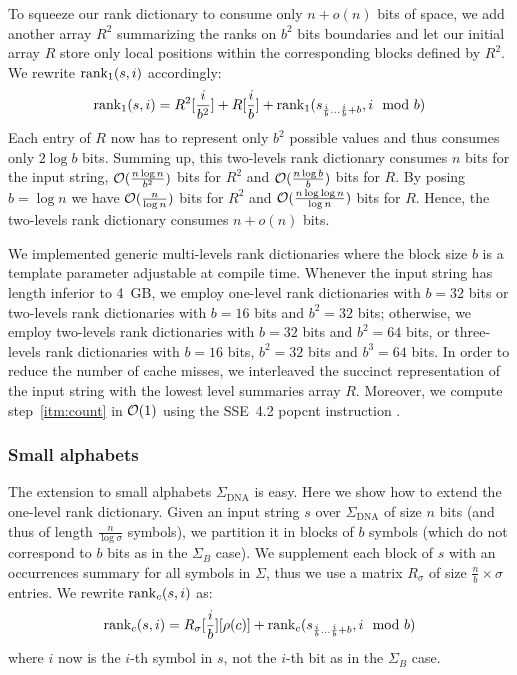 To squeeze our rank dictionary to consume only $n+o(n)$ bits of space, we add another array $R^2$ summarizing the ranks on $b^2$ bits boundaries and let our initial array $R$ store only local positions within the corresponding blocks defined by $R^2$.
We rewrite $\text{rank}_1(s,i)$ accordingly:
\begin{eqnarray}
\text{rank}_1(s,i) = R^2[\frac{i}{b^2}] + R[\frac{i}{b}] + \text{rank}_1(s_{\frac{i}{b} \dots \frac{i}{b}+b}, i \mod{b})
\end{eqnarray}
Each entry of $R$ now has to represent only $b^2$ possible values and thus consumes only $2\log{b}$ bits.
Summing up, this two-levels rank dictionary consumes $n$ bits for the input string, $\mathcal{O}(\frac{n \log{n}}{b^2})$ bits for $R^2$ and $\mathcal{O}(\frac{n \log{b}}{b})$ bits for $R$.
By posing $b=\log{n}$ we have $\mathcal{O}(\frac{n}{\log{n}})$ bits for $R^2$ and $\mathcal{O}(\frac{n \log{\log{n}}}{\log{n}})$ bits for $R$.
Hence, the two-levels rank dictionary consumes $n + o(n)$ bits.

We implemented generic multi-levels rank dictionaries where the block size $b$ is a template parameter adjustable at compile time.
Whenever the input string has length inferior to 4~GB, we employ one-level rank dictionaries with $b = 32$ bits or two-levels rank dictionaries with $b = 16$ bits and $b^2 = 32$ bits;
otherwise, we employ two-levels rank dictionaries with $b = 32$ bits and $b^2 = 64$ bits, or three-levels rank dictionaries with $b = 16$ bits, $b^2 = 32$ bits and $b^3 = 64$ bits.
In order to reduce the number of cache misses, we interleaved the succinct representation of the input string with the lowest level summaries array $R$.
Moreover, we compute step~\ref{itm:count} in $\mathcal{O}(1)$ using the SSE~4.2 popcnt instruction \citep{Intel2011}.

\subsubsection{Small alphabets}

The extension to small alphabets \eg $\Sigma_{\text{DNA}}$ is easy.
Here we show how to extend the one-level rank dictionary.
Given an input string $s$ over $\Sigma_{\text{DNA}}$ of size $n$ bits (and thus of length $\frac{n}{\log{\sigma}}$ symbols), we partition it in blocks of $b$ symbols (which do not correspond to $b$ bits as in the $\Sigma_B$ case).
We supplement each block of $s$ with an occurrences summary for all symbols in $\Sigma$, thus we use a matrix $R_{\sigma}$ of size $\frac{n}{b} \times \sigma$ entries.
We rewrite $\text{rank}_c(s,i)$ as:
\begin{eqnarray}
\text{rank}_c(s,i) = R_{\sigma}[\frac{i}{b}][\rho(c)] + \text{rank}_c(s_{\frac{i}{b} \dots \frac{i}{b}+b}, i \mod{b})
\end{eqnarray}
where $i$ now is the $i$-th symbol in $s$, not the $i$-th bit as in the $\Sigma_B$ case.

